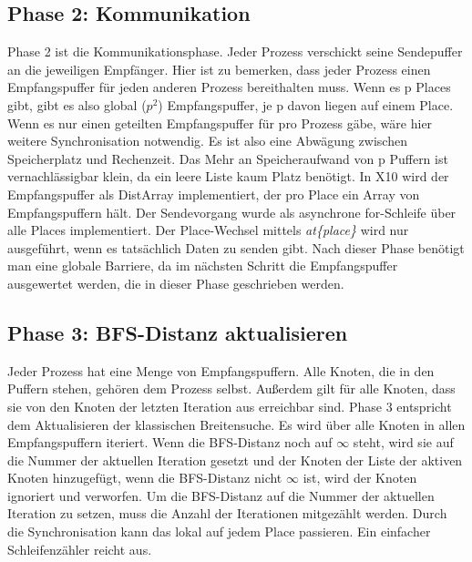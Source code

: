 \subsection{Phase 2: Kommunikation} %
\label{sub:parallel_phase_2}
Phase 2 ist die Kommunikationsphase. Jeder Prozess verschickt seine Sendepuffer an die jeweiligen Empfänger. Hier ist zu bemerken, dass jeder Prozess einen Empfangspuffer für jeden anderen Prozess bereithalten muss. Wenn es p Places gibt, gibt es also global ($p^2$) Empfangspuffer, je p davon liegen auf einem Place. Wenn es nur einen geteilten Empfangspuffer für pro Prozess gäbe, wäre hier weitere Synchronisation notwendig. Es ist also eine Abwägung zwischen Speicherplatz und Rechenzeit. Das Mehr an Speicheraufwand von p Puffern ist vernachlässigbar klein, da ein leere Liste kaum Platz benötigt. In X10 wird der Empfangspuffer als DistArray implementiert, der pro Place ein Array von Empfangspuffern hält. Der Sendevorgang wurde als asynchrone for-Schleife über alle Places implementiert. Der Place-Wechsel mittels \textit{at\{place\}} wird nur ausgeführt, wenn es tatsächlich Daten zu senden gibt. Nach dieser Phase benötigt man eine globale Barriere, da im nächsten Schritt die Empfangspuffer ausgewertet werden, die in dieser Phase geschrieben werden.

\subsection{Phase 3: BFS-Distanz aktualisieren} %
\label{sub:phase_3}
Jeder Prozess hat eine Menge von Empfangspuffern. Alle Knoten, die in den Puffern stehen, gehören dem Prozess selbst. Außerdem gilt für alle Knoten, dass sie von den Knoten der letzten Iteration aus erreichbar sind. Phase 3 entspricht dem Aktualisieren der klassischen Breitensuche. Es wird über alle Knoten in allen Empfangspuffern iteriert. Wenn die BFS-Distanz noch auf $\infty$ steht, wird sie auf die Nummer der aktuellen Iteration gesetzt und der Knoten der Liste der aktiven Knoten hinzugefügt, wenn die BFS-Distanz nicht $\infty$ ist, wird der Knoten ignoriert und verworfen. 
Um die BFS-Distanz auf die Nummer der aktuellen Iteration zu setzen, muss die Anzahl der Iterationen mitgezählt werden. Durch die Synchronisation kann das lokal auf jedem Place passieren. Ein einfacher Schleifenzähler reicht aus.


